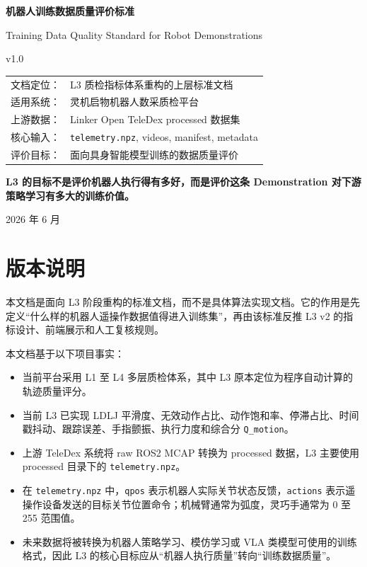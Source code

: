 \documentclass[UTF8,zihao=-4]{ctexart}
\newcommand{\docversion}{v1.0}
\newcommand{\mission}{L3 的目标不是评价机器人执行得有多好，而是评价这条 Demonstration 对下游策略学习有多大的训练价值。}
\begin{document}
\begin{titlepage}
\centering
\vspace*{2.8cm}
{\Huge\bfseries 机器人训练数据质量评价标准\par}
\vspace{0.4cm}
{\Large Training Data Quality Standard for Robot Demonstrations\par}
\vspace{0.8cm}
{\LARGE \docversion\par}
\vspace{1.5cm}
\begin{tabular}{rl}
文档定位： & L3 质检指标体系重构的上层标准文档 \\
适用系统： & 灵机启物机器人数采质检平台 \\
上游数据： & Linker Open TeleDex processed 数据集 \\
核心输入： & \texttt{telemetry.npz}, videos, manifest, metadata \\
评价目标： & 面向具身智能模型训练的数据质量评价 \\
\end{tabular}
\vfill
\begin{minipage}{0.86\linewidth}
\centering
\large\bfseries
\mission
\end{minipage}
\vfill
{\large 2026 年 6 月\par}
\end{titlepage}

\tableofcontents
\newpage

\section*{版本说明}

本文档是面向 L3 阶段重构的标准文档，而不是具体算法实现文档。它的作用是先定义“什么样的机器人遥操作数据值得进入训练集”，再由该标准反推 L3 v2 的指标设计、前端展示和人工复核规则。

本文档基于以下项目事实：
\begin{itemize}
  \item 当前平台采用 L1 至 L4 多层质检体系，其中 L3 原本定位为程序自动计算的轨迹质量评分。
  \item 当前 L3 已实现 LDLJ 平滑度、无效动作占比、动作饱和率、停滞占比、时间戳抖动、跟踪误差、手指颤振、执行力度和综合分 \texttt{Q\_motion}。
  \item 上游 TeleDex 系统将 raw ROS2 MCAP 转换为 processed 数据，L3 主要使用 processed 目录下的 \texttt{telemetry.npz}。
  \item 在 \texttt{telemetry.npz} 中，\texttt{qpos} 表示机器人实际关节状态反馈，\texttt{actions} 表示遥操作设备发送的目标关节位置命令；机械臂通常为弧度，灵巧手通常为 0 至 255 范围值。
  \item 未来数据将被转换为机器人策略学习、模仿学习或 VLA 类模型可使用的训练格式，因此 L3 的核心目标应从“机器人执行质量”转向“训练数据质量”。
\end{itemize}
\end{document}
